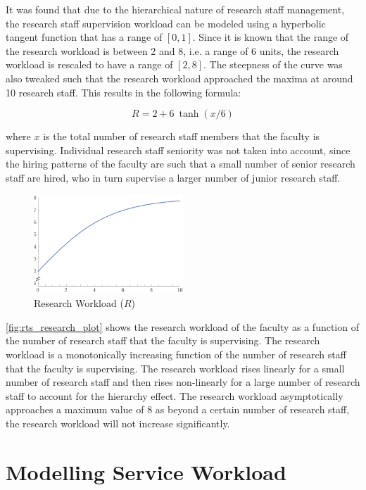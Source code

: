 It was found that due to the hierarchical nature of research staff management, the research staff supervision workload can be modeled using a hyperbolic tangent function that has a range of $[0, 1]$. Since it is known that the range of the research workload is between 2 and 8, i.e. a range of 6 units, the research workload is rescaled to have a range of $[2, 8]$. The steepness of the curve was also tweaked such that the research workload approached the maxima at around 10 research staff. This results in the following formula:

\begin{equation}
  R  = 2 + 6\ \tanh(x/6)
\end{equation}

where $x$ is the total number of research staff members that the faculty is supervising. Individual research staff seniority was not taken into account, since the hiring patterns of the faculty are such that a small number of senior research staff are hired, who in turn supervise a larger number of junior research staff.

\begin{figure}[H]
  \includegraphics[width=0.5\textwidth]{images/rts_research_plot.png}
  \centering
  \caption{Research Workload ($R$)}
  \label{fig:rts_research_plot}
\end{figure}

\autoref{fig:rts_research_plot} shows the research workload of the faculty as a function of the number of research staff that the faculty is supervising. The research workload is a monotonically increasing function of the number of research staff that the faculty is supervising. The research workload rises linearly for a small number of research staff and then rises non-linearly for a large number of research staff to account for the hierarchy effect. The research workload asymptotically approaches a maximum value of 8 as beyond a certain number of research staff, the research workload will not increase significantly.


\section{Modelling Service Workload}
\label{sec:modelling_service_workload}

